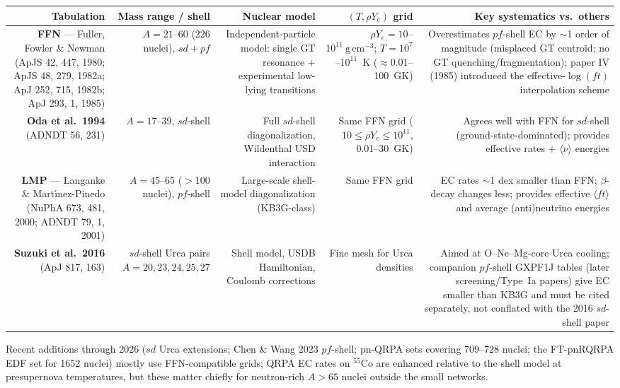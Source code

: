 \documentclass[11pt]{article}
\newcommand{\nuc}[2]{\ensuremath{{}^{#2}\mathrm{#1}}}
\newcommand{\gcc}{\ensuremath{\mathrm{g\,cm^{-3}}}}
\begin{document}
\begin{center}
\footnotesize
\setlength{\tabcolsep}{4pt}
\renewcommand{\arraystretch}{1.25}
\begin{tabularx}{\textwidth}{@{}R{0.95}R{0.85}R{1.0}R{0.9}R{1.3}@{}}
\toprule
\textbf{Tabulation} & \textbf{Mass range / shell} & \textbf{Nuclear model} & \textbf{$(T,\rho Y_e)$ grid} & \textbf{Key systematics vs.\ others} \\
\midrule
\textbf{FFN} --- Fuller, Fowler \& Newman (ApJS 42, 447, 1980; ApJS 48, 279, 1982a; ApJ 252, 715, 1982b; ApJ 293, 1, 1985) & $A = 21$--60 (226 nuclei), $sd{+}pf$ & Independent-particle model: single GT resonance + experimental low-lying transitions & $\rho Y_e = 10$--$10^{11}~\gcc$; $T = 10^7$--$10^{11}$~K ($\approx$0.01--100~GK) & Overestimates $pf$-shell EC by $\sim$1 order of magnitude (misplaced GT centroid; no GT quenching/fragmentation); paper IV (1985) introduced the effective-$\log(ft)$ interpolation scheme \\
\textbf{Oda et al.\ 1994} (ADNDT 56, 231) & $A = 17$--39, $sd$-shell & Full $sd$-shell diagonalization, Wildenthal USD interaction & Same FFN grid ($10 \le \rho Y_e \le 10^{11}$, 0.01--30~GK) & Agrees well with FFN for $sd$-shell (ground-state-dominated); provides effective rates + $\langle\nu\rangle$ energies \\
\textbf{LMP} --- Langanke \& Mart\'{\i}nez-Pinedo (NuPhA 673, 481, 2000; ADNDT 79, 1, 2001) & $A = 45$--65 ($>$100 nuclei), $pf$-shell & Large-scale shell-model diagonalization (KB3G-class) & Same FFN grid & EC rates $\sim$1 dex smaller than FFN; $\beta$-decay changes less; provides effective $\langle ft\rangle$ and average (anti)neutrino energies \\
\textbf{Suzuki et al.\ 2016} (ApJ 817, 163) & $sd$-shell Urca pairs $A = 20, 23, 24, 25, 27$ & Shell model, USDB Hamiltonian, Coulomb corrections & Fine mesh for Urca densities & Aimed at O--Ne--Mg-core Urca cooling; companion $pf$-shell GXPF1J tables (later screening/Type~Ia papers) give EC smaller than KB3G and must be cited separately, not conflated with the 2016 $sd$-shell paper \\
\bottomrule
\end{tabularx}
\end{center}

Recent additions through 2026 ($sd$ Urca extensions; Chen \& Wang 2023 $pf$-shell; pn-QRPA sets covering 709--728 nuclei; the FT-pnRQRPA EDF set for 1652 nuclei) mostly use FFN-compatible grids; QRPA EC rates on $\nuc{Co}{55}$ are enhanced relative to the shell model at presupernova temperatures, but these matter chiefly for neutron-rich $A > 65$ nuclei outside the small networks.
\end{document}
